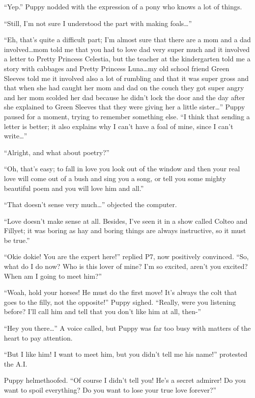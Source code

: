 ``Yep.'' Puppy nodded with the expression of a pony who knows a lot of things.

``Still, I'm not sure I understood the part with making foals\dots''

``Eh, that's quite a difficult part; I'm almost sure that there are a mom and a dad involved\dots mom told me that you had to love dad very super much and it involved a letter to Pretty Princess Celestia, but the teacher at the kindergarten told me a story with cabbages and Pretty Princess Luna\dots my old school friend Green Sleeves told me it involved also a lot of rumbling and that it was super gross and that when she had caught her mom and dad on the couch they got super angry and her mom scolded her dad because he didn't lock the door and the day after she explained to Green Sleeves that they were giving her a little sister\dots'' Puppy paused for a moment, trying to remember something else. ``I think that sending a letter is better; it also explains why I can't have a foal of mine, since I can't write\dots''

``Alright, and what about poetry?''

``Oh, that's easy; to fall in love you look out of the window and then your real love will come out of a bush and sing you a song, or tell you some mighty beautiful poem and you will love him and all.''

``That doesn't sense very much\dots'' objected the computer.

``Love doesn't make sense at all. Besides, I've seen it in a show called Colteo and Fillyet; it was boring as hay and boring things are always instructive, so it must be true.''

``Okie dokie! You are the expert here!'' replied P7, now positively convinced. ``So, what do I do now? Who is this lover of mine? I'm so excited, aren't you excited? When am I going to meet him?''

``Woah, hold your horses! He must do the first move! It's always the colt that goes to the filly, not the opposite!'' Puppy sighed. ``Really, were you listening before? I'll call him and tell that you don't like him at all, then-''

``Hey you there\dots'' A voice called, but Puppy was far too busy with matters of the heart to pay attention.

``But I like him! I want to meet him, but you didn't tell me his name!'' protested the A.I.

Puppy helmethoofed. ``Of course I didn't tell you! He's a secret admirer! Do you want to spoil everything? Do you want to lose your true love forever?''

